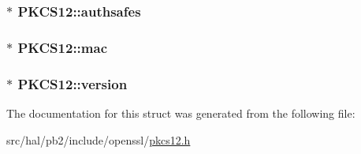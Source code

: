 \subsubsection[{\texorpdfstring{authsafes}{authsafes}}]{$\ast$ P\+K\+C\+S12\+::authsafes}\hypertarget{struct_p_k_c_s12_ab861e41463d92627b4ff4a42ca1d2cee}{}\label{struct_p_k_c_s12_ab861e41463d92627b4ff4a42ca1d2cee}
\subsubsection[{\texorpdfstring{mac}{mac}}]{$\ast$ P\+K\+C\+S12\+::mac}\hypertarget{struct_p_k_c_s12_a5184aa35cbf7f56ab133402077c9ea8e}{}\label{struct_p_k_c_s12_a5184aa35cbf7f56ab133402077c9ea8e}
\subsubsection[{\texorpdfstring{version}{version}}]{$\ast$ P\+K\+C\+S12\+::version}\hypertarget{struct_p_k_c_s12_a36ed18715f06725345e12b6f9904e908}{}\label{struct_p_k_c_s12_a36ed18715f06725345e12b6f9904e908}


The documentation for this struct was generated from the following file\+:\begin{DoxyCompactItemize}
\item 
src/hal/pb2/include/openssl/\hyperlink{pkcs12_8h}{pkcs12.\+h}\end{DoxyCompactItemize}
